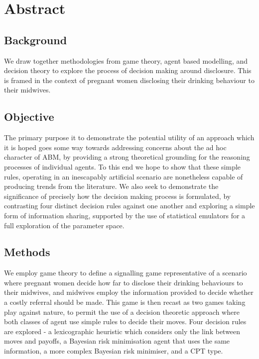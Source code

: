 \begingroup
\let\clearpage\relax
\let\cleardoublepage\relax



\section*{Abstract}

\subsection*{Background}

We draw together methodologies from game theory, agent based modelling, and decision theory to explore the process of decision making around disclosure. This is framed in the context of pregnant women disclosing their drinking behaviour to their midwives.

\subsection*{Objective} 

The primary purpose it to demonstrate the potential utility of an approach which it is hoped goes some way towards addressing concerns about the ad hoc character of \ac{ABM}, by providing a strong theoretical grounding for the reasoning processes of individual agents. To this end we hope to show that these simple rules, operating in an inescapably artificial scenario are nonetheless capable of producing trends from the literature.
We also seek to demonstrate the significance of precisely how the decision making process is formulated, by contrasting four distinct decision rules against one another and exploring a simple form of information sharing, supported by the use of statistical emulators for a full exploration of the parameter space.

\subsection*{Methods} 

We employ game theory to define a signalling game representative of a scenario where pregnant women decide how far to disclose their drinking behaviours to their midwives, and midwives employ the information provided to decide whether a costly referral should be made. This game is then recast as two games taking play against nature, to permit the use of a decision theoretic approach where both classes of agent use simple rules to decide their moves.
Four decision rules are explored - a lexicographic heuristic which considers only the link between moves and payoffs, a Bayesian risk minimisation agent that uses the same information, a more complex Bayesian risk minimiser, and a \ac{CPT} type.

